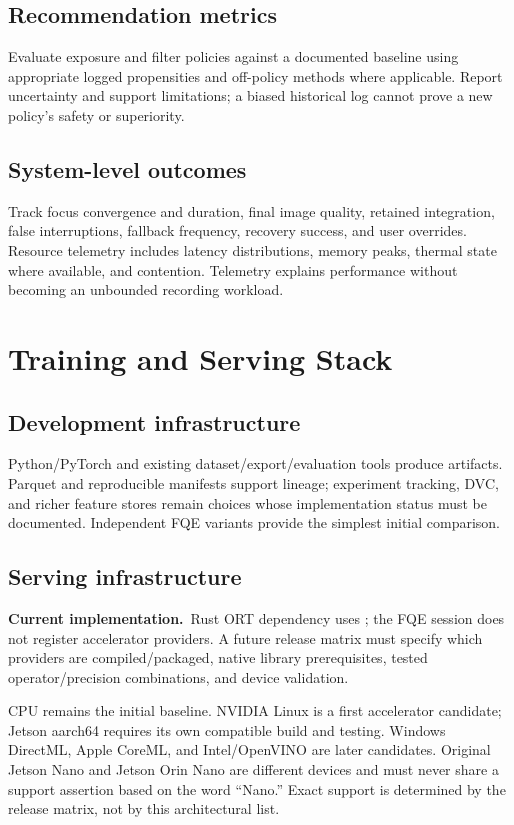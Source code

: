 \documentclass[11pt,a4paper]{article}
\newcommand{\code}[1]{\texttt{\detokenize{#1}}}
\newcommand{\current}{\textbf{Current implementation.}\ }
\begin{document}
\subsection{Recommendation metrics}
Evaluate exposure and filter policies against a documented baseline using
appropriate logged propensities and off-policy methods where applicable.
Report uncertainty and support limitations; a biased historical log cannot
prove a new policy's safety or superiority.

\subsection{System-level outcomes}
Track focus convergence and duration, final image quality, retained integration,
false interruptions, fallback frequency, recovery success, and user overrides.
Resource telemetry includes latency distributions, memory peaks, thermal state
where available, and contention. Telemetry explains performance without
becoming an unbounded recording workload.

\section{Training and Serving Stack}
\subsection{Development infrastructure}
Python/PyTorch and existing dataset/export/evaluation tools produce artifacts.
Parquet and reproducible manifests support lineage; experiment tracking, DVC,
and richer feature stores remain choices whose implementation status must be
documented. Independent FQE variants provide the simplest initial comparison.

\subsection{Serving infrastructure}
\current Rust ORT dependency uses \code{download-binaries}; the FQE session
does not register accelerator providers. A future release matrix must specify
which providers are compiled/packaged, native library prerequisites, tested
operator/precision combinations, and device validation.

CPU remains the initial baseline. NVIDIA Linux is a first accelerator candidate;
Jetson aarch64 requires its own compatible build and testing. Windows DirectML,
Apple CoreML, and Intel/OpenVINO are later candidates. Original Jetson Nano and
Jetson Orin Nano are different devices and must never share a support assertion
based on the word ``Nano.'' Exact support is determined by the release matrix,
not by this architectural list.
\end{document}
